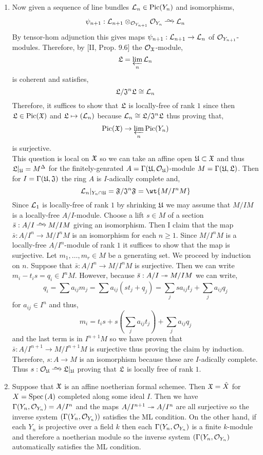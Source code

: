 \documentclass[12pt]{article}
\begin{document}
\begin{enumerate}
\item Now given a sequence of line bundles $\mathcal{L}_n \in \mathrm{Pic}(Y_n)$ and isomorphisms,
\[ \psi_{n+1} : \L_{n+1} \ot_{\struct{Y_{n+1}}} \struct{Y_{n}} \iso \L_n \]
By tensor-hom adjunction this gives maps $\psi_{n+1} : \mathcal{L}_{n+1} \to \mathcal{L}_n$ of $\mathcal{O}_{Y_{n+1}}$-modules. Therefore, by [II, Prop. 9.6] the $\mathcal{O}_{\mathfrak{X}}$-module,
\[ \mathfrak{L} = \varprojlim_n \mathcal{L}_n \]
is coherent and satisfies,
\[ \mathfrak{L} / \mathfrak{J}^n \mathfrak{L} \cong \mathcal{L}_n \]
Therefore, it suffices to show that $\mathfrak{L}$ is locally-free of rank $1$ since then $\mathfrak{L} \in \mathrm{Pic}(\mathfrak{X})$ and $\mathfrak{L} \mapsto (\mathcal{L}_n)$ because $\mathcal{L}_n \cong \mathfrak{L} / \mathfrak{J}^n \mathfrak{L}$ thus proving that,
\[ \mathrm{Pic}(\mathfrak{X}) \to \varprojlim_n \mathrm{Pic}(Y_n) \]
is surjective.
\bigskip\\ 
This question is local on $\mathfrak{X}$ so we can take an affine open $\mathfrak{U} \subset \mathfrak{X}$ and thus $\mathfrak{L}|_{\mathfrak{U}} = M^\Delta$ for the finitely-genrated $A = \Gamma(\mathfrak{U}, \mathcal{O}_{\mathfrak{U}})$-module $M = \Gamma(\mathfrak{U}, \mathfrak{L})$. Then for $I = \Gamma(\mathfrak{U}, \mathfrak{J})$ the ring $A$ is $I$-adically complete and,
\[ \L_n |_{Y_n \cap \fU} = \fF / \fJ^n \fF = \wt{M / I^n M} \]
Since $\mathcal{L}_1$ is locally-free of rank $1$ by shrinking $\mathfrak{U}$ we may assume that $M / I M$ is a locally-free $A / I$-module. Choose a lift $s \in M$ of a section $\bar{s} : A/I \iso M/IM$ giving an isomorphism. Then I claim that the map $\bar{s} : A/I^n \to M / I^n M$ is an isomorphism for each $n \ge 1$. Since $M / I^n M$ is a locally-free $A/I^n$-module of rank $1$ it suffices to show that the map is surjective. Let $m_1, \dots, m_r \in M$ be a generating set. We proceed by induction on $n$. Suppose that $\bar{s} : A / I^n \to M / I^n M$ is surjective. Then we can write $m_i - t_i s = q_i \in I^{n} M$. However, because $\bar{s} : A/I \twoheadrightarrow M/IM$ we can write,
\[ q_i = \sum a_{ij} m_j = \sum a_{ij} (s t_j + q_j) = \sum_j s a_{ij} t_j + \sum_j a_{ij} q_j \]
for $a_{ij} \in I^n$ and thus,
\[ m_i = t_i s + s \left( \sum_j a_{ij} t_j \right) + \sum_j a_{ij} q_j \]
and the last term is in $I^{n+1} M$ so we have proven that $\bar{s} : A/I^{n+1} \to M / I^{n+1} M$ is surjective thus proving the claim by induction.
\bigskip\\
Therefore, $s : A \to M$ is an isomorphism because these are $I$-adically complete. Thus $s : \struct{\fU} \iso \fL|_{\fU}$ proving that $\mathfrak{L}$ is locally free of rank $1$. 

\item Suppose that $\mathfrak{X}$ is an affine noetherian formal schemee. Then $\mathfrak{X} = \hat{X}$ for $X = \mathrm{Spec}\left( A \right)$ completed along some ideal $I$. Then we have $\Gamma(Y_n, \mathcal{O}_{Y_n}) = A / I^n$ and the maps $A/I^{n+1} \twoheadrightarrow A/I^n$ are all surjective so the inverse system $(\Gamma(Y_n, \mathcal{O}_{Y_n}))$ satisfies the ML condition. On the other hand, if each $Y_n$ is projective over a field $k$ then each $\Gamma(Y_n, \mathcal{O}_{Y_n})$ is a finite $k$-module and therefore a noetherian module so the inverse system $(\Gamma(Y_n, \mathcal{O}_{Y_n})$ automatically satisfies the ML condition. 
\end{enumerate}
\end{document}
